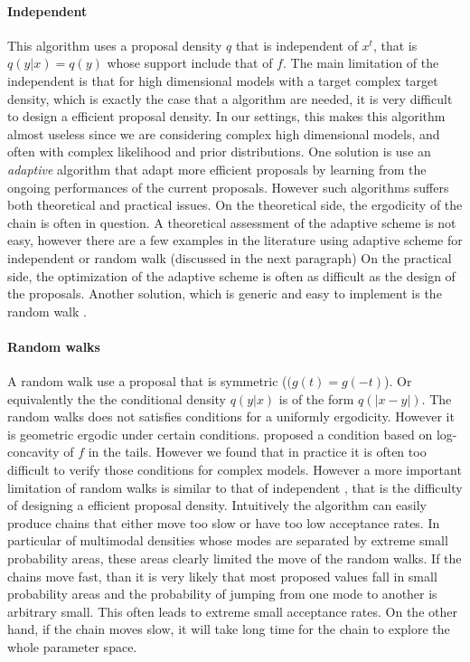 \paragraph{Independent \mha} This algorithm uses a proposal density $q$ that
is independent of $x^t$, that is $q(y|x) = q(y)$ whose support include that of
$f$. The main limitation of the independent \mha is that for high dimensional
models with a target complex target density, which is exactly the case that a
\mcmc algorithm are needed, it is very difficult to design a efficient
proposal density. In our settings, this makes this algorithm almost useless
since we are considering complex high dimensional models, and often with
complex likelihood and prior distributions. One solution is use an
\emph{adaptive} algorithm that adapt more efficient proposals by learning from
the ongoing performances of the current proposals. However such algorithms
suffers both theoretical and practical issues. On the theoretical side, the
ergodicity of the chain is often in question. A theoretical assessment of the
adaptive scheme is not easy, however there are a few examples in the
literature using adaptive scheme for independent or random walk (discussed in
the next paragraph) \mha \parencites(e.g.,
see)(){Gilks1998,Haario1999,Haario2001} On the practical side, the
optimization of the adaptive scheme is often as difficult as the design of the
proposals. Another solution, which is generic and easy to implement is the
random walk \mha.

\paragraph{Random walks} A random walk \mha use a proposal that is symmetric
($(g(t) = g(-t)$). Or equivalently the the conditional density $q(y|x)$ is of
the form $q(|x-y|)$. The random walks does not satisfies conditions for a
uniformly ergodicity. However it is geometric ergodic under certain
conditions. \textcite{Mengersen1996} proposed a condition based on
log-concavity of $f$ in the tails. However we found that in practice it is
often too difficult to verify those conditions for complex models. However a
more important limitation of random walks is similar to that of independent
\mha, that is the difficulty of designing a efficient proposal density.
Intuitively the algorithm can easily produce chains that either move too slow
or have too low acceptance rates. In particular of multimodal densities whose
modes are separated by extreme small probability areas, these areas clearly
limited the move of the random walks. If the chains move fast, than it is very
likely that most proposed values fall in small probability areas and the
probability of jumping from one mode to another is arbitrary small. This often
leads to extreme small acceptance rates. On the other hand, if the chain moves
slow, it will take long time for the chain to explore the whole parameter
space.

